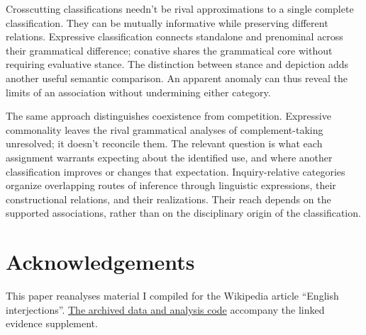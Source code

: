 \documentclass[12pt]{article}
\newif\ifblind
\begin{document}
Crosscutting classifications needn't be rival approximations to a single
complete classification. They can be mutually informative while preserving
different relations. Expressive classification connects standalone and
prenominal  across their grammatical difference; conative
 shares the grammatical core without requiring evaluative
stance. The distinction between stance and depiction adds another
useful semantic comparison. An apparent anomaly can thus reveal the
limits of an association without undermining either category.

The same approach distinguishes coexistence from competition. Expressive
commonality leaves the rival grammatical analyses of complement-taking
 unresolved; it doesn't reconcile them. The relevant
question is what each assignment warrants expecting about the identified
use, and where another classification improves or changes that expectation.
Inquiry-relative categories organize overlapping routes of inference through
linguistic expressions, their constructional relations, and their realizations.
Their reach depends on the supported
associations, rather than on the disciplinary origin of the classification.

\ifblind\else
\section*{Acknowledgements}

This paper reanalyses material I compiled for the Wikipedia article
\enquote{English interjections}.
\href{https://github.com/BrettRey/interjections-hpc/tree/master}{The archived
data and analysis code} accompany the linked evidence supplement.
\fi

\clearpage
\begingroup
\setlength{\emergencystretch}{3em}
\printbibliography
\endgroup
\end{document}
